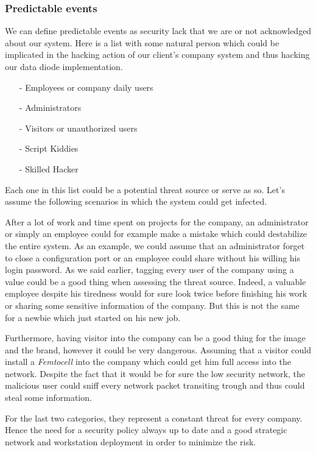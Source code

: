 \documentclass[a4paper,10pt]{article}
\begin{document}
\subsubsection{Predictable events}
We can define predictable events as security lack that we are or not acknowledged about our system. Here is a list with some natural person which could be implicated in the hacking action of our client's company system and thus hacking our data diode implementation. 
\begin{enumerate}
\item[-] Employees or company daily users
\item[-] Administrators
\item[-] Visitors or unauthorized users
\item[-] Script Kiddies
\item[-] Skilled Hacker
\end{enumerate}

Each one in this list could be a potential threat source or serve as so. Let's assume the following scenarios in which the system could get infected.

After a lot of work and time spent on projects for the company, an administrator or simply an employee could for example make a mistake which could destabilize the entire system. As an example, we could assume that an administrator forget to close a configuration port or an employee could share without his willing his login password.
As we said earlier, tagging every user of the company using a value could be a good thing when assessing the threat source. Indeed, a valuable employee despite his tiredness would for sure look twice before finishing his work or sharing some sensitive information of the company. But this is not the same for a newbie which just started on his new job.

Furthermore, having visitor into the company can be a good thing for the image and the brand, however it could be very dangerous. Assuming that a visitor could install a \emph{Femtocell} into the company which could get him full access into the network. Despite the fact that it would be for sure the low security network, the malicious user could sniff every network packet transiting trough and thus could steal some information.

For the last two categories, they represent a constant threat for every company. Hence the need for a security policy always up to date and a good strategic network and workstation deployment in order to minimize the risk. 
\end{document}

